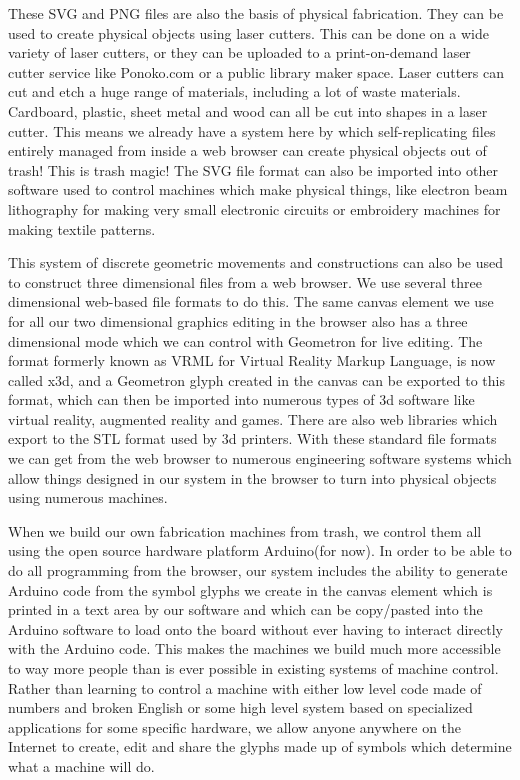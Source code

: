 These SVG and PNG files are also the basis of physical fabrication. They
can be used to create physical objects using laser cutters. This can be
done on a wide variety of laser cutters, or they can be uploaded to a
print-on-demand laser cutter service like Ponoko.com or a public library
maker space. Laser cutters can cut and etch a huge range of materials,
including a lot of waste materials. Cardboard, plastic, sheet metal and
wood can all be cut into shapes in a laser cutter. This means we already
have a system here by which self-replicating files entirely managed from
inside a web browser can create physical objects out of trash! This is
trash magic! The SVG file format can also be imported into other
software used to control machines which make physical things, like
electron beam lithography for making very small electronic circuits or
embroidery machines for making textile patterns.

This system of discrete geometric movements and constructions can also
be used to construct three dimensional files from a web browser. We use
several three dimensional web-based file formats to do this. The same
canvas element we use for all our two dimensional graphics editing in
the browser also has a three dimensional mode which we can control with
Geometron for live editing. The format formerly known as VRML for
Virtual Reality Markup Language, is now called x3d, and a Geometron
glyph created in the canvas can be exported to this format, which can
then be imported into numerous types of 3d software like virtual
reality, augmented reality and games. There are also web libraries which
export to the STL format used by 3d printers. With these standard file
formats we can get from the web browser to numerous engineering software
systems which allow things designed in our system in the browser to turn
into physical objects using numerous machines.

When we build our own fabrication machines from trash, we control them
all using the open source hardware platform Arduino(for now). In order
to be able to do all programming from the browser, our system includes
the ability to generate Arduino code from the symbol glyphs we create in
the canvas element which is printed in a text area by our software and
which can be copy/pasted into the Arduino software to load onto the
board without ever having to interact directly with the Arduino code.
This makes the machines we build much more accessible to way more people
than is ever possible in existing systems of machine control. Rather
than learning to control a machine with either low level code made of
numbers and broken English or some high level system based on
specialized applications for some specific hardware, we allow anyone
anywhere on the Internet to create, edit and share the glyphs made up of
symbols which determine what a machine will do.

